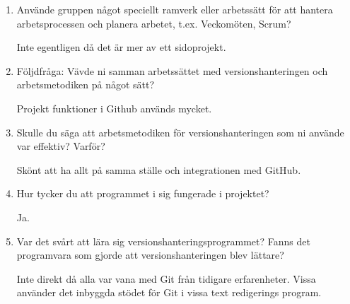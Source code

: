 \begin{enumerate}
  \item Använde gruppen något speciellt ramverk eller arbetssätt för att hantera arbetsprocessen och planera arbetet, t.ex. Veckomöten, Scrum?

  Inte egentligen då det är mer av ett sidoprojekt.

  \item Följdfråga: Vävde ni samman arbetssättet med versionshanteringen och arbetsmetodiken på något sätt?

  Projekt funktioner i Github används mycket.

  \item Skulle du säga att arbetsmetodiken för versionshanteringen som ni använde var effektiv? Varför?

  Skönt att ha allt på samma ställe och integrationen med GitHub.

  \item Hur tycker du att programmet i sig fungerade i projektet?

  Ja.

  \item Var det svårt att lära sig versionshanteringsprogrammet? Fanns det programvara som gjorde att versionshanteringen blev lättare?

  Inte direkt då alla var vana med Git från tidigare erfarenheter. Vissa använder det inbyggda stödet för Git i vissa text redigerings program.

\end{enumerate}







